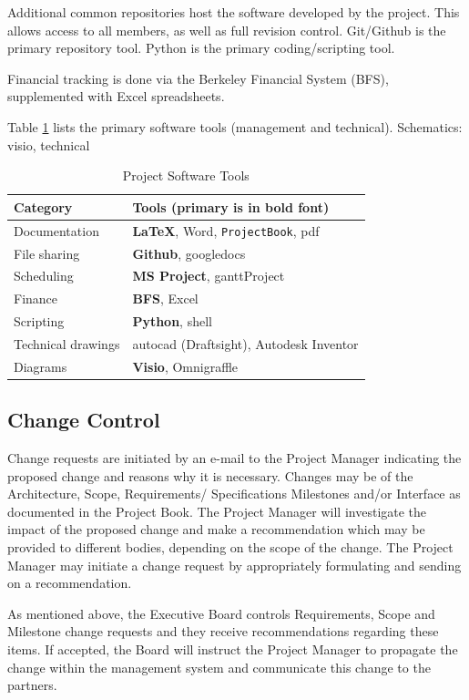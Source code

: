 \documentclass[preprint]{aastex}
\begin{document}
Additional common repositories host the software developed by the project.  This allows access to all members,
as well as full revision control.  Git/Github is the primary repository tool.  Python is the primary coding/scripting
tool.

Financial tracking is done via the Berkeley Financial System (BFS), supplemented with Excel spreadsheets.

Table \ref{tab:softwareTools} lists the primary software tools (management and technical).  Schematics:  visio, technical
\begin{table}[h]
\centering
\label{tab:softwareTools}
\caption{Project Software Tools}
\begin{tabular}{| p{1in} | p{5in} |}\hline
\textbf{Category} & \textbf{Tools (primary is in bold font)} \\ \hline
Documentation & \textbf{\LaTeX}, Word, {\tt ProjectBook}, pdf \\ \hline
File sharing & \textbf{Github}, googledocs \\ \hline
Scheduling & \textbf{MS Project}, ganttProject \\ \hline
Finance & \textbf{BFS}, Excel \\ \hline
Scripting & \textbf{Python}, shell \\ \hline
Technical drawings & autocad (Draftsight), Autodesk Inventor \\ \hline
Diagrams & \textbf{Visio}, Omnigraffle \\ \hline
\end{tabular}
\end{table}


\subsection{Change Control}
\label{sec:changecontrol}
Change requests are initiated by an e-mail to the Project Manager indicating the proposed change
and reasons why it is necessary.  Changes may be of the Architecture, Scope, Requirements/ Specifications
Milestones and/or Interface as documented in the Project Book.  The Project Manager will investigate the 
impact of the proposed change and make a recommendation which may be provided to different bodies, 
depending on the scope of the change.  The Project Manager may initiate a change request by appropriately 
formulating and sending on a recommendation.

As mentioned above, the Executive Board controls Requirements, Scope and Milestone change requests
and they receive recommendations regarding these items.  If accepted, the Board will instruct the Project Manager to 
propagate the change within the management system and communicate this change to the partners.
\end{document}
